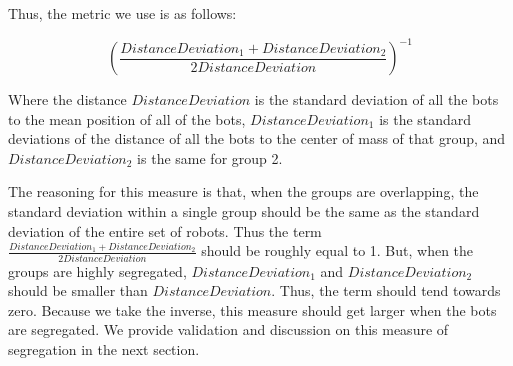 Thus, the metric we use is as follows:

$$
({\frac{DistanceDeviation_1 + DistanceDeviation_2}{2 DistanceDeviation}})^{-1}
$$

Where the distance $DistanceDeviation$ is the standard deviation of all the bots to the mean position of all of the bots, $DistanceDeviation_1$ is the standard deviations of the distance of all the bots to the center of mass of that group, and $DistanceDeviation_2$ is the same for group 2. 

The reasoning for this measure is that, when the groups are overlapping, the standard deviation within a single group should be the same as the standard deviation of the entire set of robots. 
Thus the term $\frac{DistanceDeviation_1 + DistanceDeviation_2}{2 DistanceDeviation}$ should be roughly equal to 1. 
But, when the groups are highly segregated, $DistanceDeviation_1$ and $DistanceDeviation_2$ should be smaller than $DistanceDeviation$. 
Thus, the term should tend towards zero. 
Because we take the inverse, this measure should get larger when the bots are segregated. 
We provide validation and discussion on this measure of segregation in the next section.

